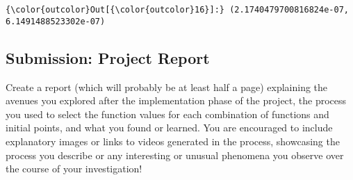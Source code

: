 \documentclass[11pt]{article}
\begin{document}
    \begin{center}
    \end{center}
    { \hspace*{\fill} \\}
    
    \begin{center}
    \end{center}
    { \hspace*{\fill} \\}
    
\begin{Verbatim}[commandchars=\\\{\}]
{\color{outcolor}Out[{\color{outcolor}16}]:} (2.1740479700816824e-07, 6.1491488523302e-07)
\end{Verbatim}
            
    \subsection{\texorpdfstring{{Submission: Project
Report}}{Submission: Project Report}}\label{submission-project-report}

    {Create a report (which will probably be at least half a page)
explaining the avenues you explored after the implementation phase of
the project, the process you used to select the function values for each
combination of functions and initial points, and what you found or
learned. You are encouraged to include explanatory images or links to
videos generated in the process, showcasing the process you describe or
any interesting or unusual phenomena you observe over the course of your
investigation!}


    
    
    
    
\end{document}
